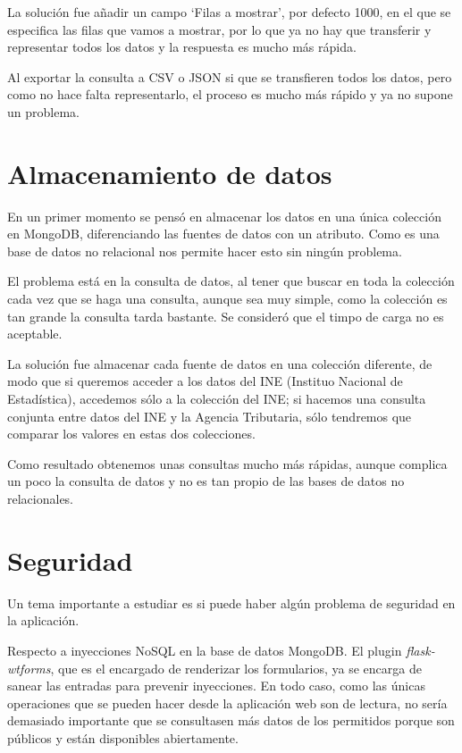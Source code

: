 La solución fue añadir un campo `Filas a mostrar', por defecto 1000, en el que se especifica las filas que vamos a mostrar, por lo que ya no hay que transferir y representar todos los datos y la respuesta es mucho más rápida.

Al exportar la consulta a CSV o JSON si que se transfieren todos los datos, pero como no hace falta representarlo, el proceso es mucho más rápido y ya no supone un problema.

\section{Almacenamiento de datos}

En un primer momento se pensó en almacenar los datos en una única colección en MongoDB, diferenciando las fuentes de datos con un atributo. Como es una base de datos no relacional nos permite hacer esto sin ningún problema.

El problema está en la consulta de datos, al tener que buscar en toda la colección cada vez que se haga una consulta, aunque sea muy simple, como la colección es tan grande la consulta tarda bastante. Se consideró que el timpo de carga no es aceptable.

La solución fue almacenar cada fuente de datos en una colección diferente, de modo que si queremos acceder a los datos del INE (Instituo Nacional de Estadística), accedemos sólo a la colección del INE; si hacemos una consulta conjunta entre datos del INE y la Agencia Tributaria, sólo tendremos que comparar los valores en estas dos colecciones.

Como resultado obtenemos unas consultas mucho más rápidas, aunque complica un poco la consulta de datos y no es tan propio de las bases de datos no relacionales.

\section{Seguridad}

Un tema importante a estudiar es si puede haber algún problema de seguridad en la aplicación.

Respecto a inyecciones NoSQL en la base de datos MongoDB. El plugin \textit{flask-wtforms}, que es el encargado de renderizar los formularios, ya se encarga de sanear las entradas para prevenir inyecciones. En todo caso, como las únicas operaciones que se pueden hacer desde la aplicación web son de lectura, no sería demasiado importante que se consultasen más datos de los permitidos porque son públicos y están disponibles abiertamente.

